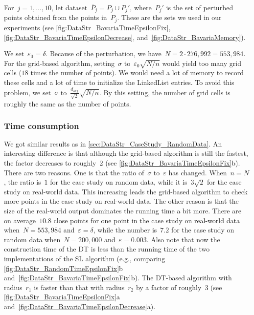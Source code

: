 For~$j=1,\ldots ,10$, 
let dataset~$\bar{P}_{j}=P_{j}\cup P_{j}'$,
where~$P_{j}'$ is the set of perturbed points 
obtained from the points in~$P_{j}$. 
These are the sets we used in our experiments
(see \figs\ref{fig:DataStr_BavariaTimeEpsilonFix}, 
\ref{fig:DataStr_BavariaTimeEpsilonDecrease}, 
and~\ref{fig:DataStr_BavariaMemory}).



We set~$\varepsilon_{0}=\delta$.
Because of the perturbation,
we have~$N=2\cdot 276{,}992=553{,}984$. 
For the grid-based algorithm, 
setting~$\sigma$ to~$\varepsilon _{0}\sqrt{N/n}$ 
would yield too many grid cells 
($18$ times the number of points). 
We would need a lot of memory to record these cells 
and a lot of time to initialize the LinkedList entries. 
To avoid this problem, we set~$\sigma$ 
to~$\frac{d_\mathrm{avg}}{\sqrt{2}}\sqrt{N/n}$.
By this setting, the number of grid cells is 
roughly the same as the number of points.



\subsubsection{Time consumption}
We got similar results as in
\sect\ref{sec:DataStr_CaseStudy_RandomData}. 
An interesting difference is that 
although the grid-based algorithm is still the fastest, 
the factor decreases to roughly~$2$
(see \fig\ref{fig:DataStr_BavariaTimeEpsilonFix}b). 
There are two reasons. 
One is that the ratio of~$\sigma$ to~$\varepsilon$ has changed. 
When~$n=N$, the ratio is~$1$ for the case study on random data,
while it is~$3\sqrt{2}$ for the case study 
on real-world data. 
This increasing leads the grid-based algorithm 
to check more points in the case study on real-world data. 
The other reason is that the size of the real-world output 
dominates the running time a bit more. 
There are on average~$10.8$ close points 
for one point in the case study on real-world data 
when~$N=553{,}984$ and~$\varepsilon =\delta$, 
while the number is~$7.2$ for the case study on random data 
when~$N=200{,}000$ and~$\varepsilon=0.003$. 
Also note that now the construction time of the DT 
is less than the running time of 
the two implementations of the SL algorithm
(e.g., comparing \figs\ref{fig:DataStr_RandomTimeEpsilonFix}b
and~\ref{fig:DataStr_BavariaTimeEpsilonFix}b). 
The DT-based algorithm with radius~$r_{1}$ is faster than 
that with radius~$r_{2}$ by a factor of roughly~$3$
(see \figs\ref{fig:DataStr_BavariaTimeEpsilonFix}a
and~\ref{fig:DataStr_BavariaTimeEpsilonDecrease}a).



